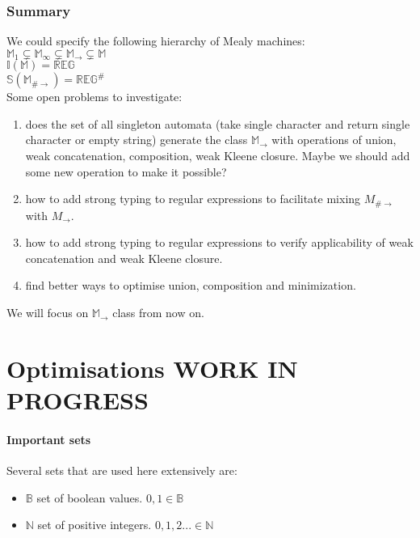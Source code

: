 \documentclass[12pt]{article}
\begin{document}
\section{Summary} We could specify the following hierarchy of Mealy machines: \\
$\mathbb{M}_1 \subsetneq \mathbb{M}_\infty \subsetneq \mathbb{M}_\rightarrow \subsetneq \mathbb{M}$ \\
$\mathbb{I}(\mathbb{M}) = \mathbb{REG}$ \\
$\mathbb{S}(\mathbb{M}_{\#\rightarrow}) = \mathbb{REG}^\#$ \\
Some open problems to investigate: 
\begin{enumerate}
	\item does the set of all singleton automata  (take single character and return single character or empty string) generate the class $\mathbb{ M}_\rightarrow$ with operations of union, weak concatenation, composition, weak Kleene closure. Maybe  we should add some new operation to make it possible?
	\item how to add strong typing to regular expressions to facilitate mixing $M_{\#\rightarrow}$ with $M_{\rightarrow}$.
	\item how to add strong typing to regular expressions to verify applicability of weak concatenation and weak Kleene closure.
	\item find better ways to optimise union, composition and minimization.
\end{enumerate}
We will focus on $\mathbb{M}_\rightarrow$ class from now on.
\part{Optimisations WORK IN PROGRESS}
\subsection{Important sets}
Several sets that are used here extensively are:
\begin{itemize}
	\item $\mathbb{ B}$ set of boolean values. $0,1 \in\mathbb{ B}$ 
	\item $\mathbb{ N}$ set of positive integers. $0,1,2... \in\mathbb{ N}$ 
\end{itemize}
\end{document}
